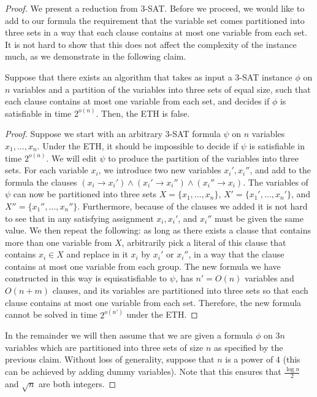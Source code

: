 \begin{proof}

We present a reduction from \textsc{3-SAT}. Before we proceed, we would like to
add to our formula the requirement that the variable set comes partitioned into
three sets in a way that each clause contains at most one variable from each
set. It is not hard to show that this does not affect the complexity of the
instance much, as we demonstrate in the following claim.

\begin{claim}\label{claim:tsat3} %
Suppose that there exists an algorithm that takes as input a
\textsc{3-SAT} instance $\phi$ on $n$ variables and a partition of the
variables into three sets of equal size, such that each clause contains at most
one variable from each set, and decides if $\phi$ is satisfiable in time
$2^{o(n)}$. Then, the ETH is false. \end{claim}

%
\begin{proof}%
Suppose we start with an arbitrary \textsc{3-SAT} formula $\psi$
on $n$ variables $x_1,\ldots,x_n$. Under the ETH, it should be impossible to
decide if $\psi$ is satisfiable in time $2^{o(n)}$. We will edit $\psi$ to
produce the partition of the variables into three sets. For each variable
$x_i$, we introduce two new variables $x_i', x_i''$, and add to the formula the
clauses $(x_i\to x_i')\land (x_i'\to x_i'')\land (x_i''\to x_i)$.  The
variables of $\psi$ can now be partitioned into three sets $X =
\{x_1,\ldots,x_n\}$, $X'=\{ x_1',\ldots,x_n'\}$, and $X''=\{
x_1'',\ldots,x_n''\}$. Furthermore, because of the clauses we added it is not
hard to see that in any satisfying assignment $x_i, x_i'$, and $x_i''$ must be
given the same value. We then repeat the following: as long as there exists a
clause that contains more than one variable from $X$, arbitrarily pick a
literal of this clause that contains $x_i\in X$ and replace in it $x_i$ by
$x_i'$ or $x_i''$, in a way that the clause contains at most one variable from
each group. The new formula we have constructed in this way is equisatisfiable
to $\psi$, has $n'=O(n)$ variables and $O(n+m)$ clauses, and its variables are
partitioned into three sets so that each clause contains at most one variable
from each set. Therefore, the new formula cannot be solved in time $2^{o(n')}$
under the ETH.  \end{proof}
    
%

In the remainder we will then assume that we are given a formula $\phi$ on $3n$
variables which are partitioned into three sets of size $n$ as specified by the
previous claim. Without loss of generality, suppose that $n$ is a power of $4$
(this can be achieved by adding dummy variables). Note that this ensures that
$\frac{\log n}{2}$ and $\sqrt{n}$ are both integers.


\end{proof}
